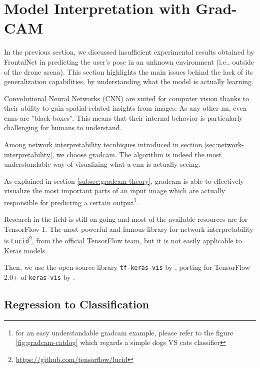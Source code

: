 \section{Model Interpretation with Grad-CAM}
\label{sec:model-interpretration}


In the previous section, we discussed insufficient experimental results obtained by FrontalNet in predicting the user's pose in an unknown environment (i.e., outside of the drone arena). This section highlights the main issues behind the lack of its generalization capabilities, by understanding what the model is actually learning.

\medskip

Convolutional Neural Networks (CNN) are suited for computer vision thanks to their ability to gain spatial-related insights from images. As any other \gls{nn}, even \gls{cnn}s are "black-boxes". This means that their internal behavior is particularly challenging for humans to understand.

Among network interpretability tecnhiques introduced in section \ref{sec:network-interpretability}, we choose \gls{gradcam}. The algorithm is indeed the most understandable way of visualizing what a \gls{cnn} is actually seeing.

As explained in section \ref{subsec:gradcam-theory}, \gls{gradcam} is able to effectively visualize the most important parts of an input image which are actually responsible for predicting a certain output\footnote{for an easy understandable \gls{gradcam} example, please refer to the figure \ref{fig:gradcam-catdog} which regards a simple dogs VS cats classifier}.

\medskip

Research in the field is still on-going and most of the available resources are for TensorFlow 1. The most powerful and famous library for network interpretability is \texttt{Lucid}\footnote{\url{https://github.com/tensorflow/lucid}}, from the official TensorFlow team, but it is not easily applicable to Keras models.

Then, we use the open-source library \texttt{tf-keras-vis} by \cite{tf-keras-vis}, porting for TensorFlow 2.0+ of \texttt{keras-vis} by \cite{keras-vis}.



\subsection{Regression to Classification}
\label{subsec:gradcam-regrtoclass}

